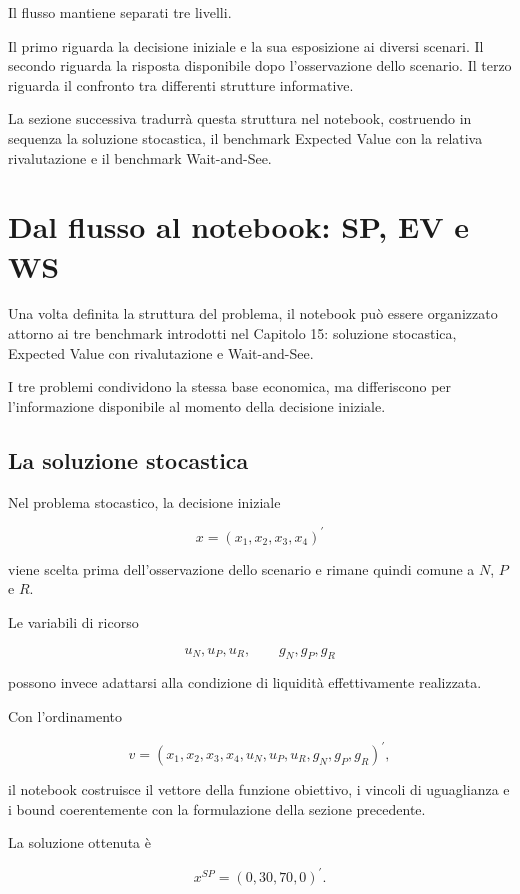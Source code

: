 Il flusso mantiene separati tre livelli.

Il primo riguarda la decisione iniziale e la sua esposizione ai diversi
scenari. Il secondo riguarda la risposta disponibile dopo l'osservazione
dello scenario. Il terzo riguarda il confronto tra differenti strutture
informative.

La sezione successiva tradurr\`a questa struttura nel notebook, costruendo in
sequenza la soluzione stocastica, il benchmark Expected Value con la relativa
rivalutazione e il benchmark Wait-and-See.


\section{Dal flusso al notebook: SP, EV e WS}

Una volta definita la struttura del problema, il notebook pu\`o essere
organizzato attorno ai tre benchmark introdotti nel Capitolo 15: soluzione
stocastica, Expected Value con rivalutazione e Wait-and-See.

I tre problemi condividono la stessa base economica, ma differiscono per
l'informazione disponibile al momento della decisione iniziale.

\subsection{La soluzione stocastica}

Nel problema stocastico, la decisione iniziale

\[
x=
\left(
x_1,x_2,x_3,x_4
\right)^{\prime}
\]

\noindent viene scelta prima dell'osservazione dello scenario e rimane quindi
comune a \(N\), \(P\) e \(R\).

Le variabili di ricorso

\[
u_N,u_P,u_R,
\qquad
g_N,g_P,g_R
\]

\noindent possono invece adattarsi alla condizione di liquidit\`a
effettivamente realizzata.

Con l'ordinamento

\[
v=
\left(
x_1,x_2,x_3,x_4,
u_N,u_P,u_R,
g_N,g_P,g_R
\right)^{\prime},
\]

\noindent il notebook costruisce il vettore della funzione obiettivo, i
vincoli di uguaglianza e i bound coerentemente con la formulazione della
sezione precedente.

La soluzione ottenuta \`e

\[
x^{SP}
=
(0,30,70,0)^{\prime}.
\]

